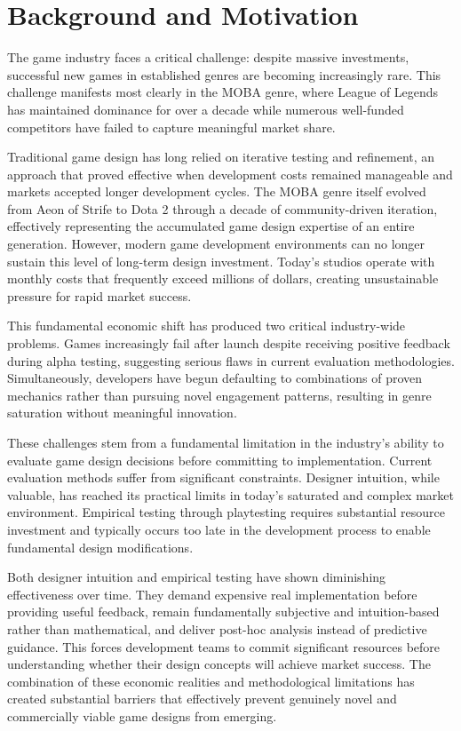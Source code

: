 \documentclass{article}
\begin{document}

\section{Background and Motivation}

The game industry faces a critical challenge: despite massive investments, successful new games in established genres are becoming increasingly rare. This challenge manifests most clearly in the MOBA genre, where League of Legends has maintained dominance for over a decade while numerous well-funded competitors have failed to capture meaningful market share.

Traditional game design has long relied on iterative testing and refinement, an approach that proved effective when development costs remained manageable and markets accepted longer development cycles. The MOBA genre itself evolved from Aeon of Strife to Dota 2 through a decade of community-driven iteration, effectively representing the accumulated game design expertise of an entire generation. However, modern game development environments can no longer sustain this level of long-term design investment. Today's studios operate with monthly costs that frequently exceed millions of dollars, creating unsustainable pressure for rapid market success.

This fundamental economic shift has produced two critical industry-wide problems. Games increasingly fail after launch despite receiving positive feedback during alpha testing, suggesting serious flaws in current evaluation methodologies. Simultaneously, developers have begun defaulting to combinations of proven mechanics rather than pursuing novel engagement patterns, resulting in genre saturation without meaningful innovation.

These challenges stem from a fundamental limitation in the industry's ability to evaluate game design decisions before committing to implementation. Current evaluation methods suffer from significant constraints. Designer intuition, while valuable, has reached its practical limits in today's saturated and complex market environment. Empirical testing through playtesting requires substantial resource investment and typically occurs too late in the development process to enable fundamental design modifications.

Both designer intuition and empirical testing have shown diminishing effectiveness over time. They demand expensive real implementation before providing useful feedback, remain fundamentally subjective and intuition-based rather than mathematical, and deliver post-hoc analysis instead of predictive guidance. This forces development teams to commit significant resources before understanding whether their design concepts will achieve market success. The combination of these economic realities and methodological limitations has created substantial barriers that effectively prevent genuinely novel and commercially viable game designs from emerging.
\end{document}
